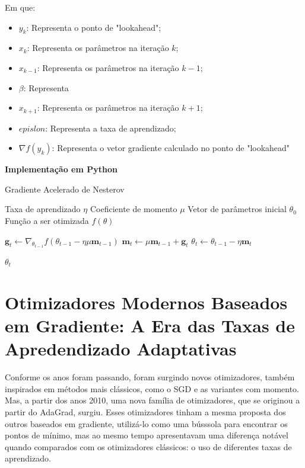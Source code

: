 Em que:

\begin{itemize}
    \item $y_k$: Representa o ponto de "lookahead";
    \item $x_k$: Representa os parâmetros na iteração $k$;
    \item $x_{k-1}$: Representa os parâmetros na iteração $k-1$;
    \item $\beta$: Representa
    \item $x_{k+1}$: Representa os parâmetros na iteração $k+1$;
    \item $epislon$: Representa a taxa de aprendizado;
    \item $\nabla f(y_k)$: Representa o vetor gradiente calculado no ponto de "lookahead"
\end{itemize}


\textbf{Implementação em Python}

\begin{algorithm}[H] %
    \caption{Gradiente Acelerado de Nesterov}
    \label{alg:gradiente-acelerado-de-nesterov}
    \begin{algorithmic}[1] %

    \Require Taxa de aprendizado $\eta$
    \Require Coeficiente de momento $\mu$
    \Require Vetor de parâmetros inicial $\theta_0$
    \Require Função a ser otimizada $f(\theta)$

        \State $\textbf{g}_t \leftarrow \nabla_{\theta_{t-1}} f(\theta_{t -1} - \eta \mu \textbf{m}_{t-1})$
        \State $\textbf{m}_t \leftarrow \mu \textbf{m}_{t-1} + \textbf{g}_t$
        \State $\theta_t \leftarrow \theta_{t-1} - \eta \textbf{m}_t$
    \EndWhile

    \State \Return $\theta_t$ 
    \end{algorithmic}
\end{algorithm}

\section{Otimizadores Modernos Baseados em Gradiente: A Era das Taxas de Apredendizado Adaptativas}

Conforme os anos foram passando, foram surgindo novos otimizadores, também inspirados em métodos mais clássicos, como o SGD e as variantes com momento. Mas, a partir dos anos 2010, uma nova família de otimizadores, que se originou a partir do AdaGrad, surgiu. Esses otimizadores tinham a mesma proposta dos outros baseados em gradiente, utilizá-lo como uma bússsola para encontrar os pontos de mínimo, mas ao mesmo tempo apresentavam uma diferença notável quando comparados com os otimizadores clássicos: o uso de diferentes taxas de aprendizado.

